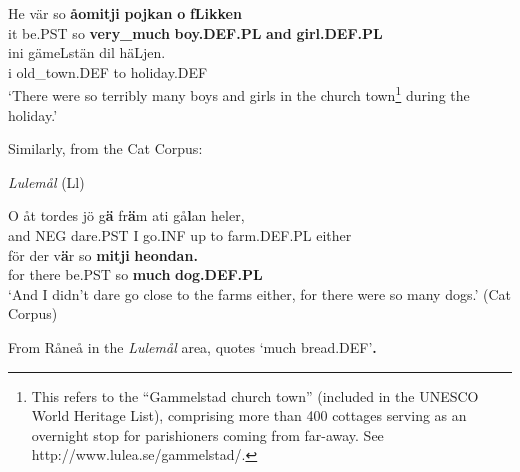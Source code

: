  \ea\label{}
\gll He  vär  so  \textbf{åomitji} \textbf{pojkan} \textbf{o} \textbf{fLikken}\\


it  be.PST  so  \textbf{very\_much} \textbf{boy.DEF.PL} \textbf{and} \textbf{girl.DEF.PL}\\

 \ea\label{}
\gll ini  gämeLstän  dil  häLjen.\\


i  old\_town.DEF  to  holiday.DEF\\

\glt ‘There were so terribly many boys and girls in the church town\footnote{ This refers to the “Gammelstad church town” (included in the UNESCO World Heritage List), comprising more than 400 cottages serving as an overnight stop for parishioners coming from far-away. See http://www.lulea.se/gammelstad/.} during the holiday.’

\z

Similarly, from the Cat Corpus:


\item 

\textit{Lulemål }(Ll) 



 \ea\label{}
\gll O  åt  tordes  jö  g\textbf{ä}  fr\textbf{ä}m  ati  gå\textbf{l}an  heler,\\


and  NEG  dare.PST  I  go.INF  up  to  farm.DEF.PL  either\\

 \ea\label{}
\gll för  der  v\textbf{ä}r  so  \textbf{mitji}\textbf{  heondan.}\\


for  there  be.PST  so  \textbf{much} \textbf{dog.DEF.PL}\\

\glt ‘And I didn’t dare go close to the farms either, for there were so many dogs.’ (Cat Corpus)

\z

From Råneå in the \textit{Lulemål} area, \citet[17]{Delsing2003a} quotes\textbf{ } ‘much bread.DEF’\textbf{. }

